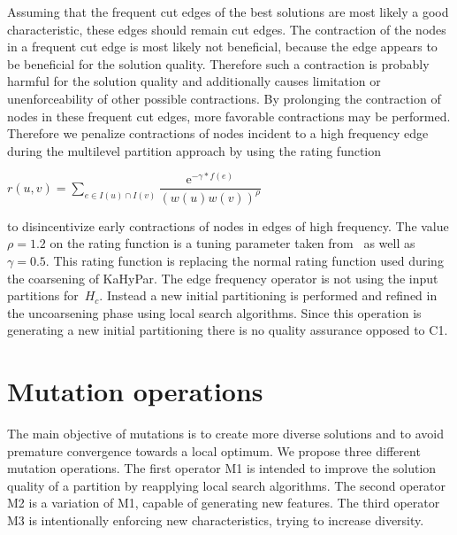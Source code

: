\documentclass[a4paper,12pt,titlepage, BCOR7mm,headsepline]{scrbook}
\numberwithin{equation}{section}
\begin{document}
Assuming that the frequent cut edges of the best solutions are most likely a good characteristic, these edges should remain cut edges.
The contraction of the nodes in a frequent cut edge is most likely not beneficial, because the edge appears to be beneficial for the solution quality. Therefore such a contraction is probably harmful for the solution quality and additionally causes limitation or unenforceability of other possible contractions.
By prolonging the contraction of nodes in these frequent cut edges, more favorable contractions may be performed.
 Therefore we penalize contractions of nodes incident to a high frequency edge during the multilevel partition approach by using the rating function
\begin{center}
$r(u,v) = \sum_{e \in I(u) \cap I(v)}\dfrac{\mathrm{e}^{-\gamma*f(e)}}{(w(u)w(v))^{\rho}}$ 
\end{center}





to disincentivize early contractions of nodes in edges of high frequency. The value $\rho = 1.2$ on the rating function is a tuning parameter taken from~\cite{delling2011graph} as well as $\gamma = 0.5$.
This rating function is replacing the normal rating function used during the coarsening of KaHyPar. 
The edge frequency operator is not using the input partitions for~$H_c$. Instead a new initial partitioning is performed and refined in the uncoarsening phase using local search algorithms.
Since this operation is generating a new initial partitioning there is no quality assurance opposed to C1.
\section{Mutation operations}
\label{sec:mutations}
The main objective of mutations is to create more diverse solutions and to avoid premature convergence towards a local optimum.
We propose three different mutation operations. The first operator M1 is intended to improve the solution quality of a partition by reapplying local search algorithms. The second operator M2 is a variation of M1, capable of generating new features. The third operator M3 is intentionally enforcing new characteristics, trying to increase diversity.
\end{document}
